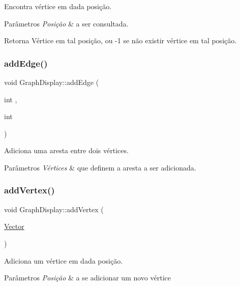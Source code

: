 Encontra vértice em dada posição. 
\begin{DoxyParams}{Parâmetros}
{\em Posição} & a ser consultada. \\
\hline
\end{DoxyParams}
\begin{DoxyReturn}{Retorna}
Vértice em tal posição, ou -\/1 se não existir vértice em tal posição. 
\end{DoxyReturn}
\mbox{\label{classGraphDisplay_a77ab2c4ae2c7facff5034e140e43ed73}} 
\subsubsection{\texorpdfstring{add\+Edge()}{addEdge()}}
{\footnotesize\ttfamily void Graph\+Display\+::add\+Edge (\begin{DoxyParamCaption}\item[{int}]{,  }\item[{int}]{ }\end{DoxyParamCaption})}

Adiciona uma aresta entre dois vértices. 
\begin{DoxyParams}{Parâmetros}
{\em Vértices} & que definem a aresta a ser adicionada. \\
\hline
\end{DoxyParams}
\mbox{\label{classGraphDisplay_aaa444bf8a296fb97a054c48e8e4a826f}} 
\subsubsection{\texorpdfstring{add\+Vertex()}{addVertex()}}
{\footnotesize\ttfamily void Graph\+Display\+::add\+Vertex (\begin{DoxyParamCaption}\item[{\hyperlink{classVector}{Vector}}]{ }\end{DoxyParamCaption})}

Adiciona um vértice em dada posição. 
\begin{DoxyParams}{Parâmetros}
{\em Posição} & a se adicionar um novo vértice \\
\hline
\end{DoxyParams}
\mbox{\label{classGraphDisplay_a694d361743f700a6250d578978aefab1}} 
